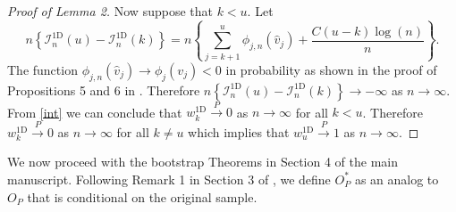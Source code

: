 \documentclass{article}\usepackage[]{graphicx}\usepackage[]{color}
\newcommand{\IoneD}{\mathcal{I}_n^{\text{1D}}}
\newcommand{\woneD}{w^{\text{1D}}}
\begin{document}
\begin{proof}[Proof of Lemma 2]
Now suppose that $k < u$. Let 
$$
  n\left\{\IoneD(u) - \IoneD(k)\right\} 
    = n\left\{\sum_{j=k+1}^u \phi_{j,n}(\hat{v}_j) 
      + \frac{C(u-k)\log(n)}{n}\right\}.
$$
The function $\phi_{j,n}(\hat{v}_j) \to \phi_{j}(v_j) < 0$ in probability as shown in the proof of Propositions 5 and 6 in \cite{algo}. Therefore 
$n\left\{\IoneD(u) - \IoneD(k)\right\} \to -\infty$ as $n \to \infty$.  
From \eqref{int} we can conclude that $\woneD_k \overset{P}{\to} 0$ as $n \to \infty$ for all $k < u$. Therefore $\woneD_k \overset{P}{\to} 0$ as $n \to \infty$ for all $k \neq u$ which implies that $\woneD_u \overset{P}{\to} 1$ as $n \to \infty$.
\end{proof}


We now proceed with the bootstrap Theorems in Section 4 of the main manuscript. Following Remark 1 in Section 3 of \cite{chang2003sieve}, we define $O_P^{\textstyle{*}}$ as an analog to $O_P$ that is conditional on the original sample.
\end{document}
